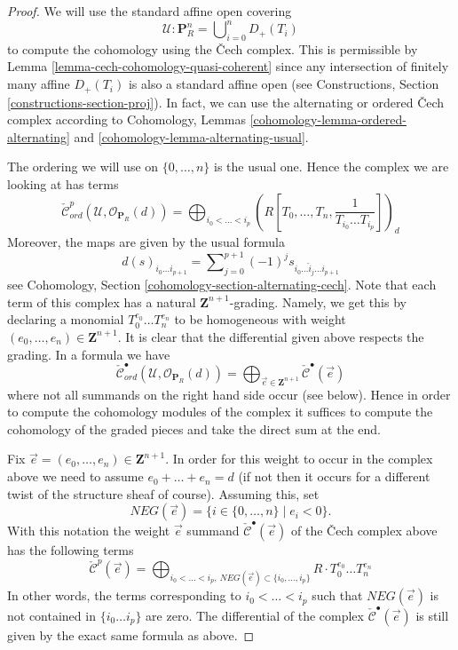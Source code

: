 \begin{proof}
We will use the standard affine open covering
$$
\mathcal{U} : \mathbf{P}^n_R = \bigcup\nolimits_{i = 0}^n D_{+}(T_i)
$$
to compute the cohomology using the {\v C}ech complex.
This is permissible by Lemma \ref{lemma-cech-cohomology-quasi-coherent}
since any intersection of finitely many affine $D_{+}(T_i)$ is also a
standard affine open (see
Constructions, Section \ref{constructions-section-proj}).
In fact, we can use the alternating or ordered {\v C}ech complex according to
Cohomology, Lemmas \ref{cohomology-lemma-ordered-alternating} and
\ref{cohomology-lemma-alternating-usual}.

\medskip\noindent
The ordering we will use on $\{0, \ldots, n\}$ is the usual one.
Hence the complex we are looking at has terms
$$
\check{\mathcal{C}}_{ord}^p(\mathcal{U}, \mathcal{O}_{\mathbf{P}_R}(d))
=
\bigoplus\nolimits_{i_0 < \ldots < i_p}
(R[T_0, \ldots, T_n, \frac{1}{T_{i_0} \ldots T_{i_p}}])_d
$$
Moreover, the maps are given by the usual formula
$$
d(s)_{i_0 \ldots i_{p + 1}} =
\sum\nolimits_{j = 0}^{p + 1} (-1)^j s_{i_0 \ldots \hat i_j \ldots i_{p + 1}}
$$
see Cohomology, Section \ref{cohomology-section-alternating-cech}.
Note that each term of this complex has a natural
$\mathbf{Z}^{n + 1}$-grading. Namely, we get this by declaring a monomial
$T_0^{e_0} \ldots T_n^{e_n}$ to be homogeneous with weight
$(e_0, \ldots, e_n) \in \mathbf{Z}^{n + 1}$. It is clear that the differential
given above respects the grading. In a formula we have
$$
\check{\mathcal{C}}_{ord}^\bullet(\mathcal{U}, \mathcal{O}_{\mathbf{P}_R}(d))
=
\bigoplus\nolimits_{\vec{e} \in \mathbf{Z}^{n + 1}}
\check{\mathcal{C}}^\bullet(\vec{e})
$$
where not all summands on the right hand side occur (see below).
Hence in order to compute the cohomology
modules of the complex it suffices to compute the cohomology of the graded
pieces and take the direct sum at the end.

\medskip\noindent
Fix $\vec{e} = (e_0, \ldots, e_n) \in \mathbf{Z}^{n + 1}$. In order for this
weight to occur in the complex above we need to assume
$e_0 + \ldots + e_n = d$ (if not then it occurs for a different twist of
the structure sheaf of course). Assuming this, set
$$
NEG(\vec{e}) = \{i \in \{0, \ldots, n\} \mid e_i < 0\}.
$$
With this notation the weight $\vec{e}$ summand
$\check{\mathcal{C}}^\bullet(\vec{e})$ of the {\v C}ech complex above has
the following terms
$$
\check{\mathcal{C}}^p(\vec{e})
=
\bigoplus\nolimits_{i_0 < \ldots < i_p,
\ NEG(\vec{e}) \subset \{i_0, \ldots, i_p\}}
R \cdot T_0^{e_0} \ldots T_n^{e_n}
$$
In other words, the terms corresponding to $i_0 < \ldots < i_p$ such
that $NEG(\vec{e})$ is not contained in $\{i_0 \ldots i_p\}$ are zero.
The differential of the complex $\check{\mathcal{C}}^\bullet(\vec{e})$
is still given by the exact same formula as above.


\end{proof}
